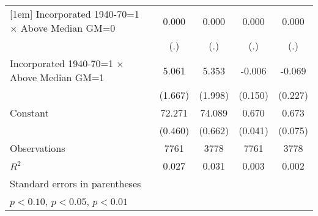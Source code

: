 \begin{table}[htbp]
\begin{tabular}{l*{4}{c}}
[1em]
Incorporated 1940-70=1 $\times$ Above Median GM=0&       0.000         &       0.000         &       0.000         &       0.000         \\
                    &         (.)         &         (.)         &         (.)         &         (.)         \\
[1em]
Incorporated 1940-70=1 $\times$ Above Median GM=1&       5.061\sym{***}&       5.353\sym{***}&      -0.006         &      -0.069         \\
                    &     (1.667)         &     (1.998)         &     (0.150)         &     (0.227)         \\
[1em]
Constant            &      72.271\sym{***}&      74.089\sym{***}&       0.670\sym{***}&       0.673\sym{***}\\
                    &     (0.460)         &     (0.662)         &     (0.041)         &     (0.075)         \\
\hline
Observations        &        7761         &        3778         &        7761         &        3778         \\
\(R^{2}\)           &       0.027         &       0.031         &       0.003         &       0.002         \\
\hline\hline
\multicolumn{5}{l}{\footnotesize Standard errors in parentheses}\\
\multicolumn{5}{l}{\footnotesize \sym{*} \(p<0.10\), \sym{**} \(p<0.05\), \sym{***} \(p<0.01\)}\\
\end{tabular}
\end{table}
